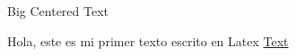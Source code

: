 \documentclass[16pt]{article}
\begin{document}
\begin{center}
	{\Huge Big Centered Text}
\end{center}

Hola, este es mi primer texto escrito en Latex
\underline{Text}
\end{document}
